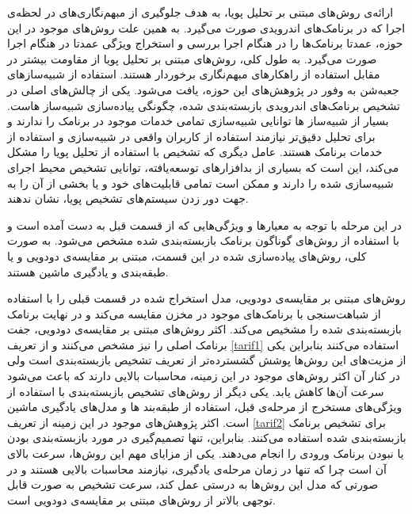  ارائه‌ی روش‌های مبتنی بر تحلیل پویا، به هدف جلوگیری از مبهم‌نگاری‌های در لحظه‌ی اجرا که در برنامک‌های اندرویدی صورت می‌گیرد. به همین علت روش‌های موجود در این حوزه، عمدتا برنامک‌ها را در هنگام اجرا بررسی و  استخراج ویژگی عمدتا در هنگام اجرا صورت می‌گیرد. به طول کلی، روش‌های مبتنی بر تحلیل پویا از مقاومت بیشتر در مقابل استفاده از راهکار‌های مبهم‌نگاری برخوردار هستند. استفاده از شبیه‌ساز‌های جعبه‌شن به وفور در پژوهش‌های این حوزه، یافت می‌شود. یکی از چالش‌های اصلی در تشخیص برنامک‌های اندرویدی بازبسته‌بندی شده، چگونگی پیاده‌سازی شبیه‌ساز‌ هاست. بسیار از شبیه‌ساز ها توانایی شبیه‌سازی تمامی خدمات موجود در برنامک‌ را ندارند و برای تحلیل دقیق‌تر نیازمند استفاده از کاربران واقعی در شبیه‌سازی و استفاده از خدمات برنامک هستند. عامل دیگری که تشخیص با استفاده از تحلیل پویا را مشکل می‌کند، این است که بسیاری از بدافزار‌های توسعه‌یافته، توانایی تشخیص محیط اجرای شبیه‌سازی شده را دارند و ممکن است تمامی قابلیت‌های خود و یا بخشی از آن‌ را به جهت دور زدن سیستم‌های تشخیص پویا، نشان ندهند.

در این مرحله با توجه به معیار‌ها و ویژگی‌هایی که از قسمت قبل به دست آمده است و با استفاده از روش‌های گوناگون برنامک بازبسته‌بندی شده مشخص می‌شود. به صورت کلی، روش‌های پیاده‌سازی شده در این قسمت، مبتنی بر مقایسه‌ی دودویی و یا طبقه‌بندی و یادگیری ماشین هستند.

 روش‌های مبتنی بر مقایسه‌ی دودویی، مدل استخراج شده در قسمت قبلی را با استفاده از شباهت‌سنجی با برنامک‌های موجود در مخزن مقایسه می‌کند و در نهایت برنامک بازبسته‌بندی شده را مشخیص می‌کند. اکثر روش‌های مبتنی بر مقایسه‌ی دودویی، جفت برنامک اصلی را نیز مشخص می‌کنند و از تعریف 
\ref{tarif1}
استفاده می‌کنند بنابراین یکی از مزیت‌های این روش‌ها پوشش گشسترده‌تر از تعریف تشخیص بازبسته‌بندی است ولی در کنار آن اکثر روش‌های موجود در این زمینه، محاسبات بالایی دارند که باعث می‌شود سرعت آن‌ها کاهش یابد.
 یکی دیگر از روش‌های تشخیص بازبسته‌بندی با استفاده از ویژگی‌های مستخرج از مرحله‌ی قبل، استفاده از طبقه‌بند ها و مدل‌های یادگیری ماشین است. اکثر پژوهش‌های موجود در این زمینه از تعریف 
\ref{tarif2}
برای تشخیص برنامک بازبسته‌بندی شده استفاده می‌کنند. بنابراین، تنها تصمیم‌گیری در مورد بازبسته‌بندی بودن یا نبودن برنامک ورودی را انجام می‌دهند. یکی از مزایای مهم این رو‌ش‌ها، سرعت بالای آن است چرا که تنها در زمان مرحله‌ی یادگیری، نیازمند محاسبات بالایی هستند و در صورتی که مدل این روش‌ها به درستی عمل کند، سرعت تشخیص به صورت قابل توجهی بالاتر از روش‌های مبتنی بر مقایسه‌ی دودویی است.

